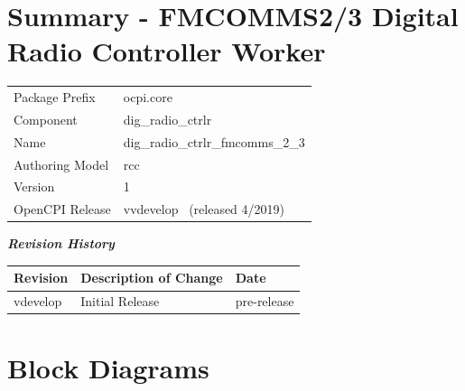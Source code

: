 \documentclass{article}
\author{} %
\date{Version \docVersion} %
\title{\docTitle}
\def\docVersion{\color{red}vdevelop}
\def\comp{dig\_radio\_ctrlr\_fmcomms\_2\_3}
\begin{document}
\section*{Summary - FMCOMMS2/3 Digital Radio Controller Worker}
\begin{longtable}{|p{}
                  |p{}|}
	\hline
	\rowcolor{blue}
	                  &                                        \\
	\hline
	Package Prefix    & ocpi.core \\
	\hline
	Component         & dig\_radio\_ctrlr \\
	\hline
	Name              & \comp                                  \\
	\hline
	Authoring Model   & rcc                                    \\
	\hline
	Version          & 1 \\
	\hline
	OpenCPI Release & v\docVersion ~ (released 4/2019) \\
	\hline
\end{longtable}

\begin{center}
  \textit{\textbf{Revision History}}
  \begin{longtable}{|p{}
                    |p{}
                    |p{}|}
    \hline
    \rowcolor{blue}
    \textbf{Revision} & \textbf{Description of Change} & \textbf{Date} \\
    \hline
    \color{red}vdevelop & Initial Release & \color{red}pre-release \\
    \hline
  \end{longtable}
\end{center}

\section{Block Diagrams}
\end{document}
